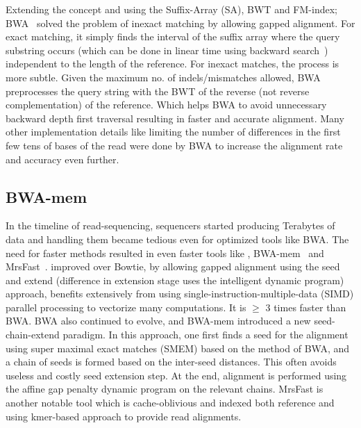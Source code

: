 Extending the concept and using the Suffix-Array (SA), BWT and FM-index; BWA~\citep{bwa} solved the problem of inexact matching by allowing gapped alignment. For exact matching, it simply finds the interval of the suffix array where the query substring occurs (which can be done in linear time using backward search~\citep{ferragina2000opportunistic}) independent to the length of the reference. For inexact matches, the process is more subtle. Given the maximum no. of indels/mismatches allowed, BWA preprocesses the query string with the BWT of the reverse (not reverse complementation) of the reference. Which helps BWA to avoid unnecessary backward depth first traversal resulting in faster and accurate alignment. Many other implementation details like limiting the number of differences in the first few tens of bases of the read were done by BWA to increase the alignment rate and accuracy even further.


\subsection{BWA-mem~\citep{bwamem}} \label{bwa-mem}

In the timeline of read-sequencing, sequencers started producing Terabytes of data and handling them became tedious even for optimized tools like BWA. The need for faster methods resulted in even faster tools like \bt, BWA-mem~\citep{bwamem} and MrsFast~\citep{mrsfast}. \bt improved over Bowtie, by  allowing gapped alignment using the seed and extend (difference in extension stage uses the intelligent dynamic program) approach, \bt benefits extensively from using single-instruction-multiple-data (SIMD) parallel processing to vectorize many computations. It is $\geq$ 3 times faster than BWA. BWA also continued to evolve, and BWA-mem introduced a new seed-chain-extend paradigm. In this approach, one first finds a seed for the alignment using super maximal exact matches (SMEM) based on the method of BWA, and a chain of seeds is formed based on the inter-seed distances. This often avoids useless and costly seed extension step. At the end, alignment is performed using the affine gap penalty dynamic program on the relevant chains. MrsFast is another notable tool which is cache-oblivious and indexed both reference and \reads using kmer-based approach to provide read alignments.

\begin{figure*}
 \centering
 \texttt{[image: rapmap/\{Avi.RPE.fig.5]}.png}
  \caption{From Top to bottom~\citep{altfigure}. : DNA, RNA and mRNA.}
  \label{fig:alt-splicing}
\end{figure*}

